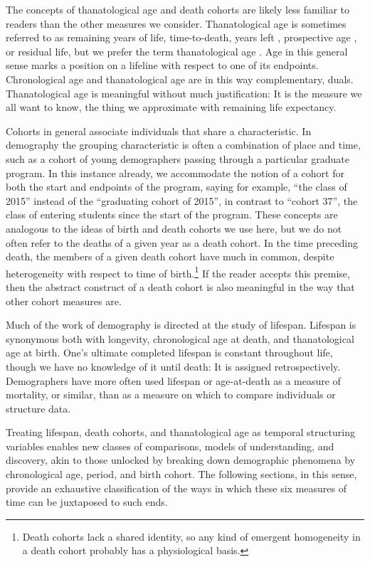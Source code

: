\documentclass[12pt,oneside,a4paper]{article} %
\begin{document}
The concepts of thanatological age and death cohorts are likely less familiar to
readers than the other measures we consider. Thanatological age is sometimes
referred to as remaining years of life, time-to-death, years left
\citep{vaupel2009life}, prospective age \citep{sanderson2007new}, or residual life, but we prefer
the term thanatological age \citep{riffe2015force}. Age in this general sense marks a position on a lifeline with respect to one of its
endpoints. Chronological age and thanatological age are in this way
complementary, duals. Thanatological age is meaningful without much
justification: It is the measure we all want to know, the thing we approximate
with remaining life expectancy.

Cohorts in general associate individuals that share a characteristic. In
demography the grouping characteristic is often a combination of place and time, such as
a cohort of young demographers passing through a particular graduate program.
In this instance already, we accommodate the notion of a cohort for both the
start and endpoints of the program, saying for example, ``the class of 2015''
instead of the ``graduating cohort of 2015'', in contrast to ``cohort 37'', the
 class of entering students since the start of the program. These concepts are analogous to the ideas of
birth and death cohorts we use here, but we do not often refer to the deaths of a given year as a death cohort.
In the time preceding death, the members of a given death cohort have much in common, despite
heterogeneity with respect to time of birth.\footnote{Death cohorts lack a
shared identity, so any kind of emergent homogeneity in a death cohort probably
has a physiological basis.} If the reader accepts this premise, then the
abstract construct of a death cohort is also meaningful in the way that other cohort measures are.

Much of the work of demography is directed at the study of lifespan. Lifespan is
synonymous both with longevity, chronological age at death, and thanatological
age at birth. One's ultimate completed lifespan is constant throughout life,
though we have no knowledge of it until death: It is assigned retrospectively.
Demographers have more often used lifespan or age-at-death as a measure of
mortality, or similar, than as a measure on which to compare individuals or
structure data.

Treating lifespan,
death cohorts, and thanatological age as temporal structuring variables
enables new classes of comparisons, models of understanding, and discovery,
akin to those unlocked by breaking down demographic phenomena by chronological age,
period, and birth cohort. The following sections, in this sense, provide an
exhaustive classification of the ways in which these six measures of time can be juxtaposed to such ends.
\end{document}
